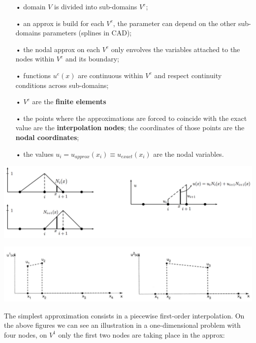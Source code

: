 	\begin{itemize}
	\item[•] domain $V$ is divided into sub-domains $V^e$;
	\item[•] an approx is build for each $V^e$, the parameter can depend on the other sub-domains parameters (splines in CAD);
	\item[•] the nodal approx on each $V^e$ only envolves the variables attached to the nodes within $V^e$ and its boundary;
	\item[•] functions $u^e(x)$ are continuous within $V^e$ and respect continuity conditions across sub-domains;\\
	
	\item[•] $V^e$ are the \textbf{finite elements}
	\item[•] the points where the approximations are forced to coincide with the exact value are the \textbf{interpolation nodes}; the coordinates of those points are the \textbf{nodal coordinates};
	\item[•] the values $u_i = u_{approx}(x_i) \equiv u_{exact}(x_i)$ are the nodal variables.  
	\end{itemize}
	
	\begin{center}
	\begin{minipage}{0.45\textwidth}
	\includegraphics[scale=0.22]{ch5/3}
	\label{fig:5.3}
	\end{minipage}
	\begin{minipage}{0.45\textwidth}
	\includegraphics[scale=0.22]{ch5/4}
	\label{fig:5.4}
	\end{minipage}
	\end{center}
	
	The simplest approximation consists in a piecewise first-order interpolation. On the above figures we can see an illustration in a one-dimensional problem with four nodes, on $V^1$ only the first two  nodes are taking place in the approx:
	
